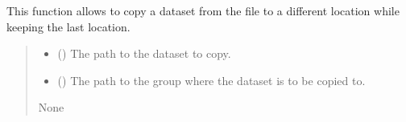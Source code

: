 \documentclass[letterpaper,10pt,english]{sphinxmanual}
\begin{document}
\begin{fulllineitems}
\begin{fulllineitems}
\end{fulllineitems}


\begin{fulllineitems}
\label{\detokenize{source/_autosummary/HDF5_BLS.Wrapper:HDF5_BLS.Wrapper.copy_dataset}}
\pysigstartsignatures
\pysiglinewithargsret
{}
{\sphinxparamcomma {}}
{}
\pysigstopsignatures
\sphinxAtStartPar
This function allows to copy a dataset from the file to a different location while keeping the last location.
\begin{quote}\begin{description}
\begin{itemize}
\item {} 
\sphinxAtStartPar
{} () \textendash{} The path to the dataset to copy.

\item {} 
\sphinxAtStartPar
{} () \textendash{} The path to the group where the dataset is to be copied to.

\end{itemize}

\sphinxAtStartPar
None

\end{description}\end{quote}

\end{fulllineitems}



\end{fulllineitems}
\end{document}
